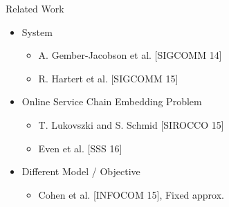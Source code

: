 \begin{frame}[<+>]{Related Work}

\begin{itemize}
  \item<+-> System
  	\begin{itemize}
    	\item A. Gember-Jacobson et al. [SIGCOMM 14]
    	\item R. Hartert et al. [SIGCOMM 15]
	\end{itemize}
  
  \item<+-> Online Service Chain Embedding Problem
  	\begin{itemize}
		\item T. Lukovszki and S. Schmid [SIROCCO 15] 
		\item Even et al. [SSS 16]
	\end{itemize}
	
  \item<+-> Different Model / Objective
  	\begin{itemize}
    	\item Cohen et al. [INFOCOM 15], Fixed approx.
	\end{itemize} 
\end{itemize}
\end{frame}